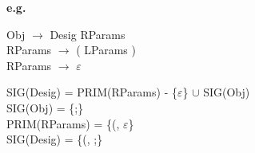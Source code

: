 \documentclass[\main/ApuntesPL.tex]{subfiles}
\begin{document}
    \par
    \textbf{e.g.}
    \begin{center}
      \begin{minipage}{.35\textwidth}
        \hspace*{5mm}Obj $\rightarrow$ Desig RParams\\
        \hspace*{5mm}RParams $\rightarrow$ ( LParams )\\
        \hspace*{5mm}RParams $\rightarrow$ $\varepsilon$
      \end{minipage}%
      \begin{minipage}{.65\textwidth}
        \hspace*{5mm}SIG(Desig) = PRIM(RParams) - \{$\varepsilon$\} $\cup$ SIG(Obj)\\
        \hspace*{5mm}SIG(Obj) = \{;\}\\
        \hspace*{5mm}PRIM(RParams) = \{(, $\varepsilon$\}\\
        \hspace*{5mm}SIG(Desig) = \{(, ;\}
      \end{minipage}
    \end{center}
\end{document}
